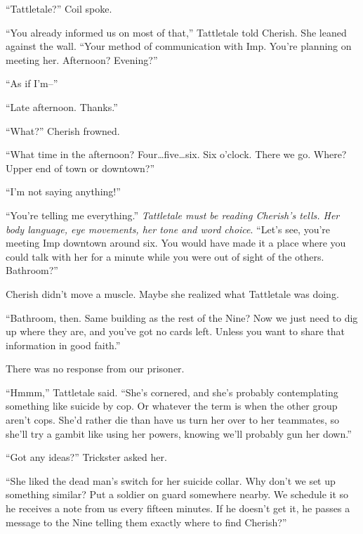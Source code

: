 ``Tattletale?'' Coil spoke.



``You already informed us on most of that,'' Tattletale told Cherish.  She leaned against the wall.  ``Your method of communication with Imp.  You're planning on meeting her.  Afternoon?  Evening?''



``As if I'm--''



``Late afternoon. Thanks.''



``What?''  Cherish frowned.



``What time in the afternoon?  Four\ldots five\ldots six.  Six o'clock.  There we go.  Where?  Upper end of town or downtown?''



``I'm not saying anything!''



``You're telling me everything.''  \emph{Tattletale must be reading Cherish's tells.  Her body language, eye movements, her tone and word choice}.  ``Let's see, you're meeting Imp downtown around six.  You would have made it a place where you could talk with her for a minute while you were out of sight of the others.  Bathroom?''



Cherish didn't move a muscle.  Maybe she realized what Tattletale was doing.



``Bathroom, then.  Same building as the rest of the Nine?  Now we just need to dig up where they are, and you've got no cards left.  Unless you want to share that information in good faith.''



There was no response from our prisoner.



``Hmmm,'' Tattletale said.  ``She's cornered, and she's probably contemplating something like suicide by cop.  Or whatever the term is when the other group aren't cops.  She'd rather die than have us turn her over to her teammates, so she'll try a gambit like using her powers, knowing we'll probably gun her down.''



``Got any ideas?'' Trickster asked her.



``She liked the dead man's switch for her suicide collar.  Why don't we set up something similar?  Put a soldier on guard somewhere nearby.  We schedule it so he receives a note  from us every fifteen minutes.  If he doesn't get it, he passes a message to the Nine telling them exactly where to find Cherish?''



